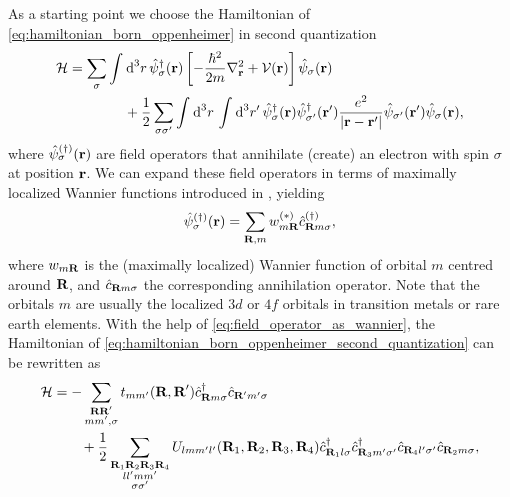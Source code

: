 \documentclass[../../main.tex]{subfiles}
\begin{document}
As a starting point we choose the Hamiltonian of \eqref{eq:hamiltonian_born_oppenheimer} in second quantization
\begin{align}\label{eq:hamiltonian_born_oppenheimer_second_quantization}
\begin{split}
	\mathcal{H}&=\sum_{\sigma}\int_{}^{}\text{d}^3r\,\hat{\psi}^{\dagger}_{\sigma}(\textbf{r})\left [-\frac{\hbar^2}{2m}\nabla^2_{\textbf{r}}+\mathcal{V}(\textbf{r})\right ]\hat{\psi}_{\sigma}(\textbf{r})\\
	 &\qquad\qquad+\frac 12 \sum_{\sigma\sigma'}\int_{}^{}\text{d}^3r\,\int_{}^{}\text{d}^3r'\,\hat{\psi}^{\dagger}_{\sigma}(\textbf{r})\hat{\psi}^{\dagger}_{\sigma'}(\textbf{r}')\frac{e^2}{|\textbf{r}-\textbf{r}'|}\hat{\psi}_{\sigma'}(\textbf{r}')\hat{\psi}_{\sigma}(\textbf{r}),
\end{split}
\end{align}
where $\hat{\psi}^{(\dagger)}_{\sigma}(\textbf{r})$ are field operators that annihilate (create) an electron with spin $\sigma$ at position $\textbf{r}$. We can expand these field operators in terms of maximally localized Wannier functions introduced in , yielding
\begin{align}\label{eq:field_operator_as_wannier}
	\hat{\psi}^{(\dagger)}_{\sigma}(\textbf{r})=\sum_{\textbf{R},m}w^{(*)}_{m\textbf{R}}\hat c^{(\dagger)}_{\textbf{R}m\sigma},
\end{align}
where $w_{m\textbf{R}}$ is the (maximally localized) Wannier function of orbital $m$ centred around $\textbf{R}$, and $\hat c_{\textbf{R}m\sigma}$ the corresponding annihilation operator. Note that the orbitals $m$ are usually the localized $3d$ or $4f$ orbitals in transition metals or rare earth elements. With the help of \eqref{eq:field_operator_as_wannier}, the Hamiltonian of \eqref{eq:hamiltonian_born_oppenheimer_second_quantization} can be rewritten as
\begin{align}\label{eq:general_hubbard_hamiltonian}
\begin{split}
	\mathcal{H}&=-\sum_{\substack{\textbf{R}\textbf{R}'\\ mm',\sigma}}t_{mm'}(\textbf{R},\textbf{R}')\hat c^{\dagger}_{\textbf{R}m\sigma}\hat c_{\textbf{R}'m'\sigma}\\
	&\qquad+\frac 12 \sum_{\substack{\textbf{R}_1\textbf{R}_2\textbf{R}_3\textbf{R}_4\\ ll'mm'\\\sigma\sigma'}}U_{lmm'l'}(\textbf{R}_1,\textbf{R}_2,\textbf{R}_3,\textbf{R}_4) \hat c^{\dagger}_{\textbf{R}_1l\sigma} \hat c^{\dagger}_{\textbf{R}_3 m'\sigma'} \hat c_{\textbf{R}_4l'\sigma'} \hat c_{\textbf{R}_2m\sigma},
\end{split}
\end{align}
\end{document}
